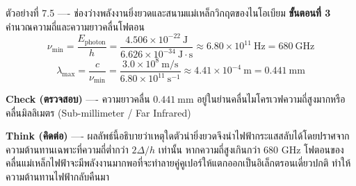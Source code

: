 \begin{psctbox}{ตัวอย่างที่ 7.5 ---- ช่องว่างพลังงานยิ่งยวดและสนามแม่เหล็กวิกฤตของไนโอเบียม}
\textbf{ขั้นตอนที่ 3} คำนวณความถี่และความยาวคลื่นโฟตอน
\begin{equation*}
\nu_{\text{min}} = \frac{E_{\text{photon}}}{h} = \frac{4.506 \times 10^{-22}~\text{J}}{6.626 \times 10^{-34}~\text{J}\cdot\text{s}} \approx 6.80 \times 10^{11}~\text{Hz} = 680~\text{GHz}
\end{equation*}
\begin{equation*}
\lambda_{\text{max}} = \frac{c}{\nu_{\text{min}}} = \frac{3.0 \times 10^8~\text{m/s}}{6.80 \times 10^{11}~\text{s}^{-1}} \approx 4.41 \times 10^{-4}~\text{m} = 0.441~\text{mm}
\end{equation*}

\textbf{Check (ตรวจสอบ)} ---- ความยาวคลื่น $0.441~\text{mm}$ อยู่ในย่านคลื่นไมโครเวฟความถี่สูงมากหรือคลื่นมิลลิเมตร (Sub-millimeter / Far Infrared)

\textbf{Think (คิดต่อ)} ---- ผลลัพธ์นี้อธิบายว่าเหตุใดตัวนำยิ่งยวดจึงนำไฟฟ้ากระแสสลับได้โดยปราศจากความต้านทานเฉพาะที่ความถี่ต่ำกว่า $2\Delta/h$ เท่านั้น หากความถี่สูงเกินกว่า $680\text{ GHz}$ โฟตอนของคลื่นแม่เหล็กไฟฟ้าจะมีพลังงานมากพอที่จะทำลายคู่คูเปอร์ให้แตกออกเป็นอิเล็กตรอนเดี่ยวปกติ ทำให้ความต้านทานไฟฟ้ากลับคืนมา
\end{psctbox}

